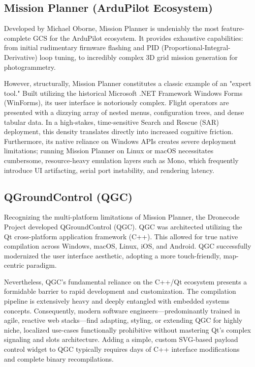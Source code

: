 \subsection{Mission Planner (ArduPilot Ecosystem)}
Developed by Michael Oborne, Mission Planner \cite{missionplanner} is undeniably the most feature-complete GCS for the ArduPilot ecosystem. It provides exhaustive capabilities: from initial rudimentary firmware flashing and PID (Proportional-Integral-Derivative) loop tuning, to incredibly complex 3D grid mission generation for photogrammetry. 

However, structurally, Mission Planner constitutes a classic example of an "expert tool." Built utilizing the historical Microsoft .NET Framework Windows Forms (WinForms), its user interface is notoriously complex. Flight operators are presented with a dizzying array of nested menus, configuration trees, and dense tabular data. In a high-stakes, time-sensitive Search and Rescue (SAR) deployment, this density translates directly into increased cognitive friction. Furthermore, its native reliance on Windows APIs creates severe deployment limitations; running Mission Planner on Linux or macOS necessitates cumbersome, resource-heavy emulation layers such as Mono, which frequently introduce UI artifacting, serial port instability, and rendering latency.

\subsection{QGroundControl (QGC)}
Recognizing the multi-platform limitations of Mission Planner, the Dronecode Project \cite{qgroundcontrol} developed QGroundControl (QGC). QGC was architected utilizing the Qt cross-platform application framework (C++). This allowed for true native compilation across Windows, macOS, Linux, iOS, and Android. QGC successfully modernized the user interface aesthetic, adopting a more touch-friendly, map-centric paradigm.

Nevertheless, QGC's fundamental reliance on the C++/Qt ecosystem presents a formidable barrier to rapid development and customization. The compilation pipeline is extensively heavy and deeply entangled with embedded systems concepts. Consequently, modern software engineers—predominantly trained in agile, reactive web stacks—find adapting, styling, or extending QGC for highly niche, localized use-cases functionally prohibitive without mastering Qt's complex signaling and slots architecture. Adding a simple, custom SVG-based payload control widget to QGC typically requires days of C++ interface modifications and complete binary recompilations.

